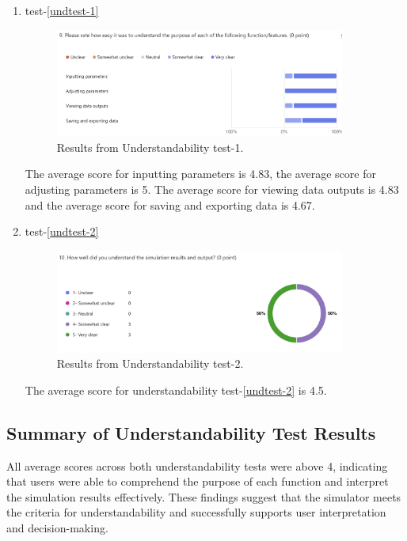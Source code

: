 \documentclass[12pt, titlepage]{article}
\begin{document}
  \begin{enumerate}
    \item test-\ref{undtest-1}
    \begin{figure}[H]  %
      \centering
      \includegraphics[width=0.9\textwidth]{und_test1.png}  %
      \caption{Results from Understandability test-1.}
      \label{fig:myimage}
    \end{figure}
    The average score for inputting parameters is 4.83, the average score for adjusting parameters is 5. The average score for viewing data outputs is 4.83 and the average score for saving and exporting data is 4.67.
    \item test-\ref{undtest-2}
    \begin{figure}[H]  %
      \centering
      \includegraphics[width=0.9\textwidth]{und_test2.png}  %
      \caption{Results from Understandability test-2.}
      \label{fig:myimage}
    \end{figure}
    The average score for understandability test-\ref{undtest-2} is 4.5.
  \end{enumerate}

  \subsection{Summary of Understandability Test Results}
  All average scores across both understandability tests were above 4, indicating that users were able to comprehend the purpose of each function and interpret the simulation results effectively. These findings suggest that the simulator meets the criteria for understandability and successfully supports user interpretation and decision-making.
\end{document}
